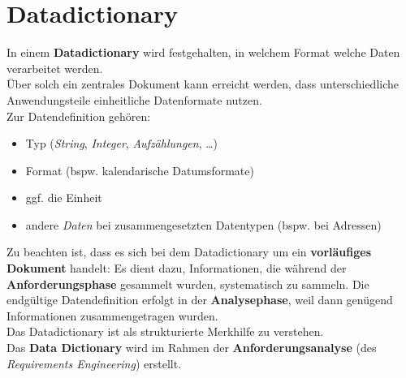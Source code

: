 \section{Datadictionary}

\begin{tcolorbox}[title=Dataditctionary]
    In einem \textbf{Datadictionary} wird festgehalten, in welchem Format welche Daten verarbeitet werden.\\
    Über solch ein zentrales Dokument kann erreicht werden, dass unterschiedliche Anwendungsteile einheitliche Datenformate nutzen.\\

    \noindent
    Zur Datendefinition gehören:
    \begin{itemize}
        \item Typ (\textit{String}, \textit{Integer}, \textit{Aufzählungen}, \ldots)
        \item Format (bspw. kalendarische Datumsformate)
        \item ggf. die Einheit
        \item andere \textit{Daten} bei zusammengesetzten Datentypen (bspw. bei Adressen)
    \end{itemize}

    \noindent
    Zu beachten ist, dass es sich bei dem Datadictionary um ein \textbf{vorläufiges Dokument} handelt: Es dient dazu, Informationen, die während der \textbf{Anforderungsphase} gesammelt wurden, systematisch zu sammeln.
    Die endgültige Datendefinition erfolgt in der \textbf{Analysephase}, weil dann genügend Informationen zusammengetragen wurden.    \\
    Das Datadictionary ist als strukturierte Merkhilfe zu verstehen.\\

    \noindent
    Das \textbf{Data Dictionary} wird im Rahmen der \textbf{Anforderungsanalyse} (des \textit{Requirements Engineering}) erstellt.
\end{tcolorbox}
